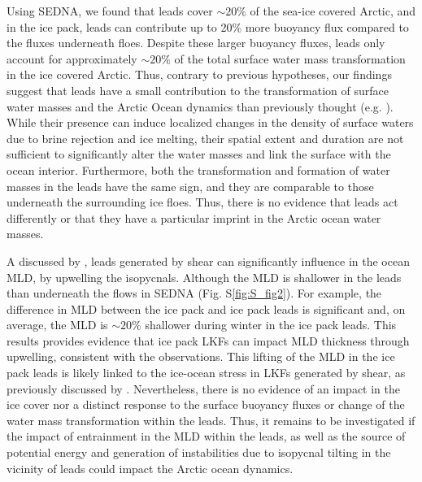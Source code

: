 \documentclass[draft]{agujournal2019}
\begin{document}
Using SEDNA, we found that leads cover $\sim 20\%$ of the sea-ice covered Arctic, and in the ice pack, leads can contribute up to 20\% more buoyancy flux compared to the fluxes underneath floes. Despite these larger buoyancy fluxes, leads only account for approximately $\sim 20\%$ of the total surface water mass transformation in the ice covered Arctic. Thus, contrary to previous hypotheses, our findings suggest that leads have a small contribution to the transformation of surface water masses and the Arctic Ocean dynamics than previously thought (e.g. \citealp{Hutter_identification_2019, McPhee_LKF_2005}). While their presence can induce localized changes in the density of surface waters due to brine rejection and ice melting, their spatial extent and duration are not sufficient to significantly alter the water masses and link the surface with the ocean interior. Furthermore, both the transformation and formation of water masses in the leads have the same sign, and they are comparable to those underneath the surrounding ice floes. Thus, there is no evidence that leads act differently or that they have a particular imprint in the Arctic ocean water masses.


A discussed by \citealt{McPhee_LKF_2005}, leads generated by shear can significantly influence in the ocean MLD, by upwelling the isopycnals. Although the MLD is shallower in the leads than underneath the flows in SEDNA (Fig. S\ref{fig:S_fig2}). For example, the difference in MLD between the ice pack and ice pack leads is significant and, on average, the MLD is $\sim 20\%$ shallower during winter in the ice pack leads. This results provides evidence that ice pack LKFs can impact MLD thickness through upwelling, consistent with the observations. This lifting of the MLD in the ice pack leads is likely linked to the ice-ocean stress in LKFs generated by shear, as previously discussed by \citealt{McPhee_LKF_2005, Wettlaufer_insulator_1997, Smith_polynyas_1990}. Nevertheless, there is no evidence of an impact in the ice cover nor a distinct response to the surface buoyancy fluxes or change of the water mass transformation within the leads. Thus, it remains to be investigated if the impact of entrainment in the MLD within the leads, as well as the source of potential energy and generation of instabilities due to isopycnal tilting in the vicinity of leads could impact the Arctic ocean dynamics.
\end{document}
